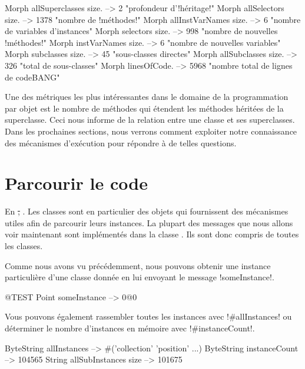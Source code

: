 \documentclass[a4paper,10pt,twoside]{book}
\begin{document}
\begin{code}{}
Morph allSuperclasses size.  -->       2 "profondeur d'!héritage!"
Morph allSelectors size.        --> 1378 "nombre de !méthodes!"
Morph allInstVarNames size. -->      6 "nombre de variables d'instances"
Morph selectors size.             -->  998 "nombre de nouvelles !méthodes!"
Morph instVarNames size.     -->      6 "nombre de nouvelles variables"
Morph subclasses size.          -->    45 "sous-classes directes"
Morph allSubclasses size.      -->  326 "total de sous-classes"
Morph linesOfCode.               --> 5968 "nombre total de lignes de codeBANG"
\end{code}

Une des métriques les plus intéressantes dans le domaine de la programmation par objet est le nombre de méthodes qui étendent les méthodes héritées de la superclasse. Ceci nous informe de la relation entre une classe et ses superclasses.
Dans les prochaines sections, nous verrons comment exploiter notre connaissance des mécanismes d'exécution pour répondre à de telles questions.

\section{Parcourir le code}

En \st, \mantra. Les classes sont en particulier des objets qui fournissent des mécanismes utiles afin de parcourir leurs instances.
La plupart des messages que nous allons voir maintenant sont implémentés dans la classe . Ils sont donc compris de toutes les classes.

Comme nous avons vu précédemment, nous pouvons obtenir une instance particulière d'une classe donnée en lui envoyant le message \ct!someInstance!.
\begin{code}{@TEST} %
Point someInstance --> 0@0
\end{code}

Vous pouvons également rassembler toutes les instances avec \ct!#allInstances! ou déterminer le nombre d'instances en mémoire avec \ct!#instanceCount!.

\begin{code}{} %
ByteString allInstances        --> #('collection' 'position'  ...)
ByteString instanceCount    --> 104565
String allSubInstances size -->  101675
\end{code}
\end{document}
